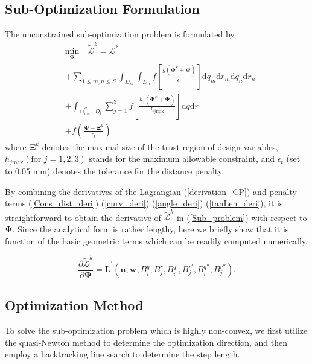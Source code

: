 \documentclass[journal]{IEEEtran}
\renewcommand{\vec}[1]{\mathbf{#1}}
\theoremstyle{definition}
\renewcommand{\vec}[1]{\mathbf{#1}}
\begin{document}
\subsection{Sub-Optimization Formulation}
The unconstrained sub-optimization problem is formulated by
\begin{equation}
  \label{Sub_problem}
  \begin{aligned}
     & \underset{\vec{\Psi}}{\text{min}} \quad \tilde{\mathcal{L}}^k = \mathcal{L}^*                                                                                            \\
     & + \sum_{1\leq m,n \leq S} \int_{D_m}\int_{D_n}  f\left[\frac{g\left(\vec{\Phi}^k+\vec{\Psi}\right)}{\epsilon_t}\right] \text{d}q_m\text{d}r_m     \text{d}q_n\text{d}r_n \\
     & + \int_{\cup_{i=1}^S D_i} \sum_{j=1}^{3}f\left[\frac{h_j\left(\vec{\Phi}^k+\vec{\Psi}\right)}{h_{j\text{max}}}\right]\text{d}q\text{d}r                                  \\
     & + f\left(\frac{\vec{\Psi} - \vec{\Xi}^k}{\epsilon_t}\right)
  \end{aligned}
\end{equation}
where $\vec{\Xi}^k$ denotes the maximal size of the trust region of design variables, $h_{j\text{max}} (\text{for } j=1,2,3)$ stands for the maximum allowable constraint, and $\epsilon_t$ (set to 0.05 mm) denotes the tolerance for the distance penalty.

By combining the derivatives of the Lagrangian (\ref{derivation_CP}) and penalty terms (\ref{Cons_dist_deri}) (\ref{curv_deri}) (\ref{angle_deri}) (\ref{tanLen_deri}), it is straightforward to obtain the derivative of $\tilde{\mathcal{L}}^k$ in (\ref{Sub_problem}) with respect to $\vec{\Psi}$. Since the analytical form is rather lengthy, here we briefly show that it is function of the basic geometric terms which can be readily computed numerically,

\begin{equation}\label{CompleteDer}
  \frac{\partial \tilde{\mathcal{L}}^k}{\partial {\vec{\Psi}}}=\mathbf{\tilde{L}}^\prime(\mathbf{u}, \mathbf{w}, B_i^q, B_j^r, B_i^{q'}, B_j^{r'}, B_i^{q''}, B_j^{r''}).
\end{equation}

\subsection{Optimization Method}
To solve the sub-optimization problem which is highly non-convex, we first utilize the quasi-Newton method to determine the optimization direction, and then employ a backtracking line search to determine the step length.
\end{document}
